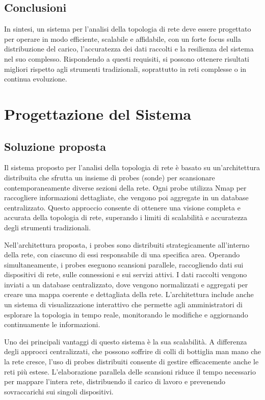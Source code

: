 \documentclass[target=bach,aauheader=,style=]{thud}
\begin{document}
\section{Conclusioni}

In sintesi, un sistema per l'analisi della topologia di rete deve essere progettato per operare in modo efficiente, scalabile e affidabile, con un forte focus sulla distribuzione del carico, l'accuratezza dei dati raccolti e la resilienza del sistema nel suo complesso. Rispondendo a questi requisiti, si possono ottenere risultati migliori rispetto agli strumenti tradizionali, soprattutto in reti complesse o in continua evoluzione.

\chapter{Progettazione del Sistema}

\section{Soluzione proposta}
Il sistema proposto per l'analisi della topologia di rete è basato su un'architettura distribuita che sfrutta un insieme di probes (sonde) per scansionare contemporaneamente diverse sezioni della rete. Ogni probe utilizza Nmap per raccogliere informazioni dettagliate, che vengono poi aggregate in un database centralizzato. Questo approccio consente di ottenere una visione completa e accurata della topologia di rete, superando i limiti di scalabilità e accuratezza degli strumenti tradizionali.

Nell'architettura proposta, i probes sono distribuiti strategicamente all'interno della rete, con ciascuno di essi responsabile di una specifica area. Operando simultaneamente, i probes eseguono scansioni parallele, raccogliendo dati sui dispositivi di rete, sulle connessioni e sui servizi attivi. I dati raccolti vengono inviati a un database centralizzato, dove vengono normalizzati e aggregati per creare una mappa coerente e dettagliata della rete. L'architettura include anche un sistema di visualizzazione interattivo che permette agli amministratori di esplorare la topologia in tempo reale, monitorando le modifiche e aggiornando continuamente le informazioni.

Uno dei principali vantaggi di questo sistema è la sua scalabilità. A differenza degli approcci centralizzati, che possono soffrire di colli di bottiglia man mano che la rete cresce, l'uso di probes distribuiti consente di gestire efficacemente anche le reti più estese. L'elaborazione parallela delle scansioni riduce il tempo necessario per mappare l'intera rete, distribuendo il carico di lavoro e prevenendo sovraccarichi sui singoli dispositivi.
\end{document}
